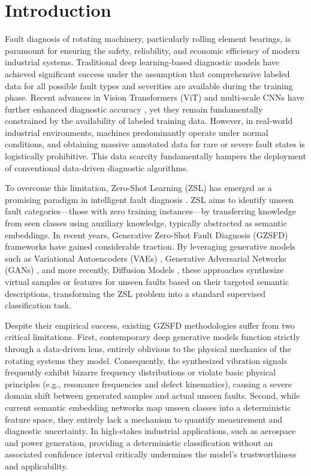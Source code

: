 \section{Introduction}
\label{sec:intro}

Fault diagnosis of rotating machinery, particularly rolling element bearings, is paramount for ensuring the safety, reliability, and economic efficiency of modern industrial systems. Traditional deep learning-based diagnostic models \cite{zhao2019deep,lei2020applications,chen2023deep} have achieved significant success under the assumption that comprehensive labeled data for all possible fault types and severities are available during the training phase. Recent advances in Vision Transformers (ViT) and multi-scale CNNs have further enhanced diagnostic accuracy \cite{li2024few,yang2024novel}, yet they remain fundamentally constrained by the availability of labeled training data. However, in real-world industrial environments, machines predominantly operate under normal conditions, and obtaining massive annotated data for rare or severe fault states is logistically prohibitive. This data scarcity fundamentally hampers the deployment of conventional data-driven diagnostic algorithms. 

To overcome this limitation, Zero-Shot Learning (ZSL) has emerged as a promising paradigm in intelligent fault diagnosis \cite{xian2018zero,pan2009survey}. ZSL aims to identify unseen fault categories—those with zero training instances—by transferring knowledge from seen classes using auxiliary knowledge, typically abstracted as semantic embeddings. In recent years, Generative Zero-Shot Fault Diagnosis (GZSFD) frameworks have gained considerable traction. By leveraging generative models such as Variational Autoencoders (VAEs) \cite{kingma2013auto}, Generative Adversarial Networks (GANs) \cite{goodfellow2014generative}, and more recently, Diffusion Models \cite{ho2020denoising}, these approaches synthesize virtual samples or features for unseen faults based on their targeted semantic descriptions, transforming the ZSL problem into a standard supervised classification task.

Despite their empirical success, existing GZSFD methodologies suffer from two critical limitations. First, contemporary deep generative models function strictly through a data-driven lens, entirely oblivious to the physical mechanics of the rotating systems they model. Consequently, the synthesized vibration signals frequently exhibit bizarre frequency distributions or violate basic physical principles (e.g., resonance frequencies and defect kinematics), causing a severe domain shift between generated samples and actual unseen faults. Second, while current semantic embedding networks \cite{schonfeld2019generalized} map unseen classes into a deterministic feature space, they entirely lack a mechanism to quantify measurement and diagnostic uncertainty. In high-stakes industrial applications, such as aerospace and power generation, providing a deterministic classification without an associated confidence interval critically undermines the model's trustworthiness and applicability.

